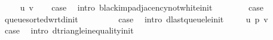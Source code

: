\begin{isabellebody}
\isamarkupfalse%
\isanewline
\ \ \isamarkupfalse%
\ {\isacharparenleft}{\kern0pt}{}\ u\ v{\isacharparenright}{\kern0pt}\isanewline
\ \ \isamarkupfalse%
\ {\isacharquery}{\kern0pt}case\ \isamarkupfalse%
\ {\isacharparenleft}{\kern0pt}intro\ black{\isacharunderscore}{\kern0pt}imp{\isacharunderscore}{\kern0pt}adjacency{\isacharunderscore}{\kern0pt}not{\isacharunderscore}{\kern0pt}white{\isacharunderscore}{\kern0pt}init{\isacharparenright}{\kern0pt}\isanewline
{}\isamarkupfalse%
\isanewline
\ \ \isamarkupfalse%
\ {}{}\isanewline
\ \ \isamarkupfalse%
\ {\isacharquery}{\kern0pt}case\ \isamarkupfalse%
\ queue{\isacharunderscore}{\kern0pt}sorted{\isacharunderscore}{\kern0pt}wrt{\isacharunderscore}{\kern0pt}d{\isacharunderscore}{\kern0pt}init\ \isacommand{{\isachardot}{\kern0pt}}\isamarkupfalse%
\isanewline
{}\isamarkupfalse%
\isanewline
\ \ \isamarkupfalse%
\ {}{}\isanewline
\ \ \isamarkupfalse%
\ {\isacharquery}{\kern0pt}case\ \isamarkupfalse%
\ {\isacharparenleft}{\kern0pt}intro\ d{\isacharunderscore}{\kern0pt}last{\isacharunderscore}{\kern0pt}queue{\isacharunderscore}{\kern0pt}le{\isacharunderscore}{\kern0pt}init{\isacharparenright}{\kern0pt}\isanewline
{}\isamarkupfalse%
\isanewline
\ \ \isamarkupfalse%
\ {\isacharparenleft}{\kern0pt}{}{}\ u\ p\ v{\isacharparenright}{\kern0pt}\isanewline
\ \ \isamarkupfalse%
\ {\isacharquery}{\kern0pt}case\ \isamarkupfalse%
\ {\isacharparenleft}{\kern0pt}intro\ d{\isacharunderscore}{\kern0pt}triangle{\isacharunderscore}{\kern0pt}inequality{\isacharunderscore}{\kern0pt}init{\isacharparenright}{\kern0pt}\isanewline
{}\isamarkupfalse%
%
\endisatagproof
{\isafoldproof}%
%
\isadelimproof
%
\endisadelimproof
%
\isadelimdocument
%
\endisadelimdocument
%
\isatagdocument
%

\end{isabellebody}

